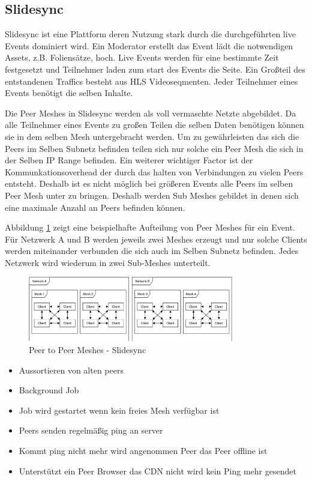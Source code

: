 \subsection{Slidesync}
Slidesync ist eine Plattform deren Nutzung stark durch die durchgeführten live Events dominiert wird. Ein Moderator erstellt das Event lädt die notwendigen Assets, z.B. Foliensätze, hoch. Live Events werden für eine bestimmte Zeit festgesetzt und Teilnehmer laden zum start des Events die Seite. Ein Großteil des entstandenen Traffics besteht aus HLS Videoseqmenten. Jeder Teilnehmer eines Events benötigt die selben Inhalte. 

Die Peer Meshes in Slidesync werden als voll vermaschte Netzte abgebildet. Da alle Teilnehmer eines Events zu großen Teilen die selben Daten benötigen können sie in dem selben Mesh untergebracht werden. Um zu gewährleisten das sich die Peers im Selben Subnetz befinden teilen sich nur solche ein Peer Mesh die sich in der Selben IP Range befinden. Ein weiterer wichtiger Factor ist der Kommunkationsoverhead der durch das halten von Verbindungen zu vielen Peers entsteht. Deshalb ist es nicht möglich bei größeren Events alle Peers im selben Peer Mesh unter zu bringen. Deshalb werden Sub Meshes gebildet in denen sich eine maximale Anzahl an Peers befinden können. 

Abbildung \ref{fig:mesh-slidesync} zeigt eine beispielhafte Aufteilung von Peer Meshes für ein Event. Für Netzwerk A und B werden jeweils zwei Meshes erzeugt und nur solche Clients werden miteinander verbunden die sich auch im Selben Subnetz befinden. Jedes Netzwerk wird wiederum in zwei Sub-Meshes unterteilt.

\begin{figure}[!h]
	\centering
	\includegraphics[width=0.8\textwidth]{figures/slidesync_peer_meshes}
	\caption[A Figure Short-Title]{Peer to Peer Meshes - Slidesync}
	\label{fig:mesh-slidesync}
\end{figure}

\begin{itemize}
	\item Aussortieren von alten peers
	\item Background Job
	\item Job wird gestartet wenn kein freies Mesh verfügbar ist
	\item Peers senden regelmäßig ping an server
	\item Kommt ping nicht mehr wird angenommen Peer das Peer offline ist
	\item Unterstützt ein Peer Browser das CDN nicht wird kein Ping mehr gesendet
\end{itemize}
%

